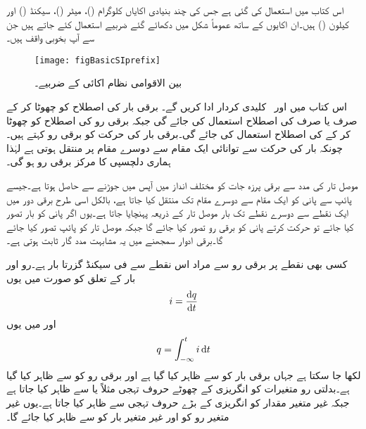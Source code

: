 اس کتاب میں  استعمال کی گئی ہے جس کی چند بنیادی اکایاں کلوگرام ()، میٹر ()، سیکنڈ () اور کیلون () ہیں۔ان اکایوں کے ساتھ عموماً شکل  میں دکھائے گئے ضربیے استعمال کئے جاتے ہیں جن سے آپ بخوبی واقف ہیں۔
\begin{figure}
\centering
\texttt{[image: figBasicSIprefix]}
\caption{بین الاقوامی نظام اکائی کے ضربیے۔}
\label{شکل_بنیادی_سابقہ}
\end{figure}

اس کتاب میں   اور
   \,  کلیدی کردار ادا کریں گے۔ برقی بار کی اصطلاح کو چھوٹا کر کے صرف  یا صرف  کی اصطلاح استعمال کی جائے گی جبکہ برقی رو کی اصطلاح کو چھوٹا کر کے  کی اصطلاح استعمال کی جائے گی۔برقی بار کی حرکت کو برقی رو کہتے ہیں۔چونکہ بار کی حرکت سے توانائی ایک مقام سے دوسرے مقام پر منتقل ہوتی ہے لہٰذا ہماری دلچسپی کا مرکز برقی رو ہو گی۔

موصل تار  کی مدد سے برقی پرزہ جات کو مختلف انداز میں آپس میں جوڑنے سے  حاصل ہوتا ہے۔جیسے پائپ سے پانی کو ایک مقام سے دوسرے مقام تک منتقل کیا جاتا ہے، بالکل اسی طرح برقی دور میں ایک نقطے سے دوسرے نقطے تک بار موصل تار کے ذریعہ پہنچایا جاتا ہے۔یوں اگر پانی کو بار تصور کیا جائے تو حرکت کرتے پانی کو برقی رو تصور کیا جائے گا جبکہ موصل تار کو پائپ تصور کیا جائے گا۔برقی ادوار سمجھنے میں یہ مشابہت مدد گار ثابت ہوتی ہے۔  

کسی بھی نقطے پر برقی رو سے مراد اس نقطے سے فی سیکنڈ گزرتا بار  ہے۔رو اور بار کے تعلق کو  صورت میں یوں
\begin{align}\label{مساوات_بنیادی_رو_تعریف}
i=\frac{\dif q}{\dif t}
\end{align}
اور  میں یوں
\begin{align}
q=\int_{-\infty}^{t} i \dif t
\end{align}
لکھا جا سکتا ہے جہاں برقی بار کو  سے ظاہر کیا گیا ہے اور برقی رو کو  سے ظاہر کیا گیا ہے۔بدلتی رو متغیرات کو انگریزی کے چھوٹے حروف تہجی  مثلاً  یا  سے ظاہر کیا جاتا ہے جبکہ غیر متغیر مقدار کو انگریزی کے بڑے حروف تہجی سے ظاہر کیا جاتا ہے۔یوں غیر متغیر رو کو  اور غیر متغیر بار کو  سے ظاہر کیا جائے گا۔

